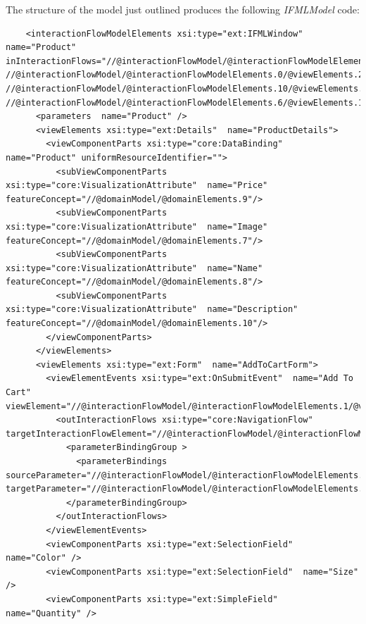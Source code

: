 The structure of the model just outlined produces the following \textit{IFMLModel} code:
\vspace{0.5cm}
\lstset{language=XML}
\begin{lstlisting} 
    <interactionFlowModelElements xsi:type="ext:IFMLWindow"  name="Product" inInteractionFlows="//@interactionFlowModel/@interactionFlowModelElements.1/@viewElements.2/@viewElementEvents.0/@outInteractionFlows.0 //@interactionFlowModel/@interactionFlowModelElements.0/@viewElements.2/@viewElementEvents.0/@outInteractionFlows.0 //@interactionFlowModel/@interactionFlowModelElements.10/@viewElements.0/@viewElementEvents.0/@outInteractionFlows.0 //@interactionFlowModel/@interactionFlowModelElements.6/@viewElements.1/@viewElements.0/@viewElementEvents.0/@outInteractionFlows.0">
      <parameters  name="Product" />
      <viewElements xsi:type="ext:Details"  name="ProductDetails">
        <viewComponentParts xsi:type="core:DataBinding"  name="Product" uniformResourceIdentifier="">
          <subViewComponentParts xsi:type="core:VisualizationAttribute"  name="Price" featureConcept="//@domainModel/@domainElements.9"/>
          <subViewComponentParts xsi:type="core:VisualizationAttribute"  name="Image" featureConcept="//@domainModel/@domainElements.7"/>
          <subViewComponentParts xsi:type="core:VisualizationAttribute"  name="Name" featureConcept="//@domainModel/@domainElements.8"/>
          <subViewComponentParts xsi:type="core:VisualizationAttribute"  name="Description" featureConcept="//@domainModel/@domainElements.10"/>
        </viewComponentParts>
      </viewElements>
      <viewElements xsi:type="ext:Form"  name="AddToCartForm">
        <viewElementEvents xsi:type="ext:OnSubmitEvent"  name="Add To Cart" viewElement="//@interactionFlowModel/@interactionFlowModelElements.1/@viewElements.1">
          <outInteractionFlows xsi:type="core:NavigationFlow"  targetInteractionFlowElement="//@interactionFlowModel/@interactionFlowModelElements.9">
            <parameterBindingGroup >
              <parameterBindings  sourceParameter="//@interactionFlowModel/@interactionFlowModelElements.1/@viewElements.1/@viewComponentParts.2" targetParameter="//@interactionFlowModel/@interactionFlowModelElements.1/@viewElements.1/@viewComponentParts.2"/>
            </parameterBindingGroup>
          </outInteractionFlows>
        </viewElementEvents>
        <viewComponentParts xsi:type="ext:SelectionField"  name="Color" />
        <viewComponentParts xsi:type="ext:SelectionField"  name="Size" />
        <viewComponentParts xsi:type="ext:SimpleField"  name="Quantity" />

\end{lstlisting}
